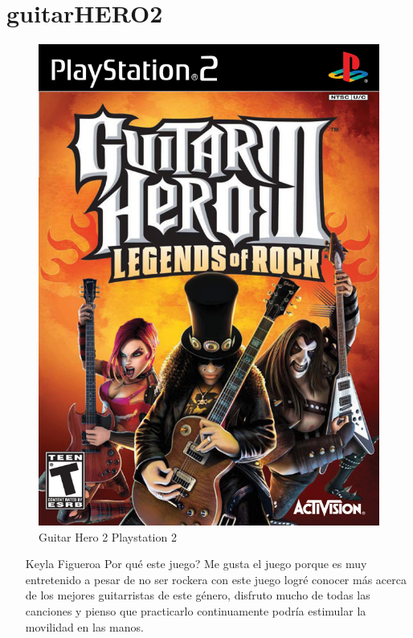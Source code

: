 \section{guitarHERO2}

\begin{figure}[htbp]
\begin{center}
\includegraphics[width=.60\textwidth]{./imagenes/guitar.jpg} 
\caption{Guitar Hero 2 Playstation 2}
\label{Guitar Hero2}
\end{center}
\end{figure}


\begin{itemize}
\item[Keyla Figueroa] Por qué este juego? Me gusta el juego porque es muy entretenido a pesar de no ser rockera con este juego logré conocer más acerca de los mejores guitarristas de este género, disfruto mucho de todas las canciones y pienso que practicarlo continuamente podría estimular la movilidad en las manos.
\end{itemize}